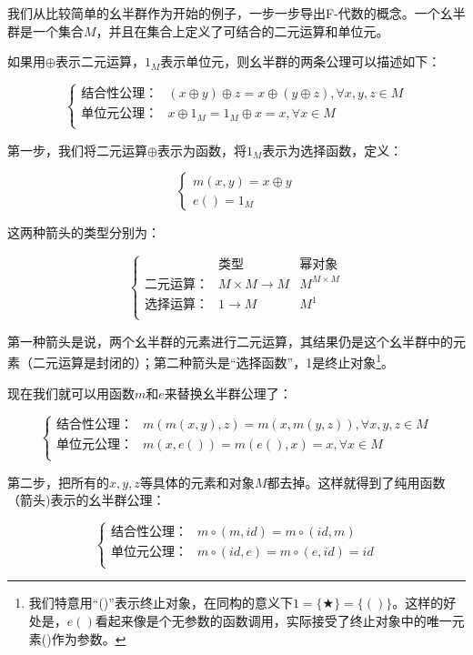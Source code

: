 \documentclass{article}
\begin{document}
\begin{example}
我们从比较简单的幺半群作为开始的例子，一步一步导出F-代数的概念。一个幺半群是一个集合$M$，并且在集合上定义了可结合的二元运算和单位元。

如果用$\oplus$表示二元运算，$1_M$表示单位元，则幺半群的两条公理可以描述如下：

\[
\begin{cases}
\text{结合性公理：} & (x \oplus y) \oplus z = x \oplus (y \oplus z), \forall x, y, z \in M \\
\text{单位元公理：} & x \oplus 1_M = 1_M \oplus x = x, \forall x \in M \\
\end{cases}
\]

第一步，我们将二元运算$\oplus$表示为函数，将$1_M$表示为选择函数，定义：

\[
\begin{cases}
m (x, y) = x \oplus y \\
e () = 1_M
\end{cases}
\]

这两种箭头的类型分别为：

\[
\left \{
\begin{array}{lll}
 & \text{类型} & \text{幂对象} \\
\text{二元运算：} & M \times M \to M & M^{M \times M}\\
\text{选择运算：} & 1 \to M & M^1 \\
\end{array}
\right .
\]

第一种箭头是说，两个幺半群的元素进行二元运算，其结果仍是这个幺半群中的元素（二元运算是封闭的）；第二种箭头是“选择函数”，1是终止对象\footnote{我们特意用“()”表示终止对象，在同构的意义下$1 = \{ \bigstar \} = \{ () \}$。这样的好处是，$e()$看起来像是个无参数的函数调用，实际接受了终止对象中的唯一元素()作为参数。}。

现在我们就可以用函数$m$和$e$来替换幺半群公理了：

\[
\begin{cases}
\text{结合性公理：} & m(m(x, y), z) = m(x, m(y, z)), \forall x, y, z \in M \\
\text{单位元公理：} & m(x, e()) = m(e(), x) = x, \forall x \in M \\
\end{cases}
\]

第二步，把所有的$x, y, z$等具体的元素和对象$M$都去掉。这样就得到了纯用函数（箭头)表示的幺半群公理：

\[
\begin{cases}
\text{结合性公理：} & m \circ (m, id) = m \circ (id, m) \\
\text{单位元公理：} & m \circ (id, e) = m \circ (e, id) = id \\
\end{cases}
\]


\end{example}
\end{document}
